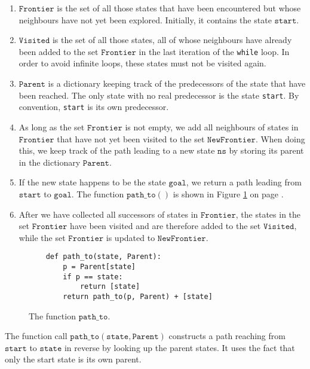 \begin{enumerate}
\item $\texttt{Frontier}$ is the set of all those states that have been encountered but whose
      neighbours have not yet been explored.  Initially, it contains the state $\texttt{start}$.
\item $\texttt{Visited}$ is the set of all those states, all of whose neighbours have already been
      added to the set $\texttt{Frontier}$ in the last iteration of the \texttt{while} loop.  In order to avoid
      infinite loops, these states must not be visited again.
\item $\texttt{Parent}$ is a dictionary keeping track of the predecessors of the state that have been reached.
      The only state with no real predecessor is the state \texttt{start}.  By convention, \texttt{start} is its
      own predecessor.
\item As long as the set $\texttt{Frontier}$ is not empty, we add all neighbours of states in
      $\texttt{Frontier}$ that have not yet been visited to the set $\texttt{NewFrontier}$.
      When doing this, we keep track of the path leading to a new state $\texttt{ns}$ by storing its
      parent in the dictionary $\texttt{Parent}$.
\item If the new state happens to be the state $\texttt{goal}$, we return a path leading from
      $\texttt{start}$ to $\texttt{goal}$.  The function $\texttt{path\_to}()$ is shown in Figure
      \ref{fig:pathTo.stlx} on page \pageref{fig:pathTo.stlx}.
\item After we have collected all successors of states in $\texttt{Frontier}$, the states
      in the set $\texttt{Frontier}$ have been visited and are therefore added to the set
      $\texttt{Visited}$, while the set $\texttt{Frontier}$ is updated to $\texttt{NewFrontier}$.
\end{enumerate}

\begin{figure}[!ht]
\centering
\begin{verbatim}
    def path_to(state, Parent):
        p = Parent[state]
        if p == state:
            return [state]
        return path_to(p, Parent) + [state]
\end{verbatim}
\vspace*{-0.3cm}
\caption{The function $\texttt{path\_to}$.}
\label{fig:pathTo.stlx}
\end{figure}
The function call $\mathtt{path\_to}(\mathtt{state}, \mathtt{Parent})$ constructs a path reaching
from $\texttt{start}$ to $\texttt{state}$ in reverse by looking up the parent states.  It uses the fact that
only the start state is its own parent.

